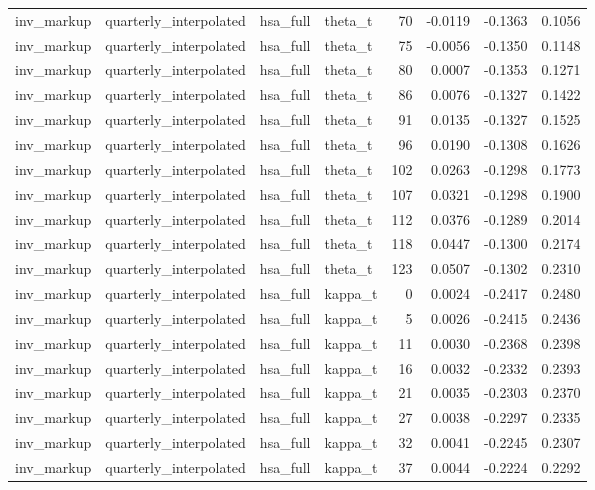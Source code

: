 \begin{tabular}{llllrrrr}
inv\_markup & quarterly\_interpolated & hsa\_full & theta\_t & 70 & -0.0119 & -0.1363 & 0.1056 \\
inv\_markup & quarterly\_interpolated & hsa\_full & theta\_t & 75 & -0.0056 & -0.1350 & 0.1148 \\
inv\_markup & quarterly\_interpolated & hsa\_full & theta\_t & 80 & 0.0007 & -0.1353 & 0.1271 \\
inv\_markup & quarterly\_interpolated & hsa\_full & theta\_t & 86 & 0.0076 & -0.1327 & 0.1422 \\
inv\_markup & quarterly\_interpolated & hsa\_full & theta\_t & 91 & 0.0135 & -0.1327 & 0.1525 \\
inv\_markup & quarterly\_interpolated & hsa\_full & theta\_t & 96 & 0.0190 & -0.1308 & 0.1626 \\
inv\_markup & quarterly\_interpolated & hsa\_full & theta\_t & 102 & 0.0263 & -0.1298 & 0.1773 \\
inv\_markup & quarterly\_interpolated & hsa\_full & theta\_t & 107 & 0.0321 & -0.1298 & 0.1900 \\
inv\_markup & quarterly\_interpolated & hsa\_full & theta\_t & 112 & 0.0376 & -0.1289 & 0.2014 \\
inv\_markup & quarterly\_interpolated & hsa\_full & theta\_t & 118 & 0.0447 & -0.1300 & 0.2174 \\
inv\_markup & quarterly\_interpolated & hsa\_full & theta\_t & 123 & 0.0507 & -0.1302 & 0.2310 \\
inv\_markup & quarterly\_interpolated & hsa\_full & kappa\_t & 0 & 0.0024 & -0.2417 & 0.2480 \\
inv\_markup & quarterly\_interpolated & hsa\_full & kappa\_t & 5 & 0.0026 & -0.2415 & 0.2436 \\
inv\_markup & quarterly\_interpolated & hsa\_full & kappa\_t & 11 & 0.0030 & -0.2368 & 0.2398 \\
inv\_markup & quarterly\_interpolated & hsa\_full & kappa\_t & 16 & 0.0032 & -0.2332 & 0.2393 \\
inv\_markup & quarterly\_interpolated & hsa\_full & kappa\_t & 21 & 0.0035 & -0.2303 & 0.2370 \\
inv\_markup & quarterly\_interpolated & hsa\_full & kappa\_t & 27 & 0.0038 & -0.2297 & 0.2335 \\
inv\_markup & quarterly\_interpolated & hsa\_full & kappa\_t & 32 & 0.0041 & -0.2245 & 0.2307 \\
inv\_markup & quarterly\_interpolated & hsa\_full & kappa\_t & 37 & 0.0044 & -0.2224 & 0.2292 \\

\end{tabular}
